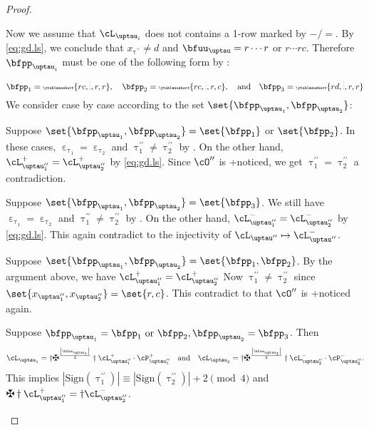 \documentclass[12pt,a4paper]{amsart}
\def\abs#1{\left|{#1}\right|}
\def\DD{\nabla}
\numberwithin{equation}{section}
\theoremstyle{remark}
\def\ssign{\mathrm{Sign}}
\let\ytb=\ytableaushort
\newcommand{\tytb}[1]{{\tiny\ytb{#1}}}
\def\cOpp{\cO^{\prime\prime}}
\def\pcL{\cL^+}
\def\ncL{\cL^-}
\def\pcP{\cP^+}
\def\ncP{\cP^-}
\def\uptaup{\uptau^{\prime}}
\def\uptaupp{\uptau^{\prime\prime}}
\begin{document}
\begin{proof}
\begin{enumPF}
\item
Now we assume that $\cL_{\uptau_{i}}$ does not contains a 1-row marked by $-/=$.
By \eqref{eq:gd.ls}, we conclude that $x_{\uptaupp}\neq d$ and
$\bfuu_{\uptau} = r\cdots r$ or $ r\cdots rc$. Therefore $\bfpp_{\uptau_{i}}$
must be one of the following form by :
  \[
    \bfpp_{1} =\tytb{rc,\vdots,r,r}, \quad \bfpp_{2}=\tytb{rc,\vdots,r,c}, \quad\text{and}
    \quad\bfpp_{3}= \tytb{rd,\vdots,r,r}\\
  \]
  We consider case by case according to the set $\set{\bfpp_{\uptau_{1}},\bfpp_{\uptau_{2}}}$:
  \begin{enumPF}
    \item Suppose
    $\set{\bfpp_{\uptau_{1}},\bfpp_{\uptau_{2}}}=\set{\bfpp_{1}}$ or $ \set{\bfpp_{2}}$.
    In these cases, $\upepsilon_{\uptau_{1}}=\upepsilon_{\uptau_{2}}$ and
    $\uptaupp_{1}\neq \uptaupp_{2}$ by .
    On the other hand, $\pcL_{\uptaupp_{1}}=\pcL_{\uptaupp_{2}}$ by \eqref{eq:gd.ls}.
    Since $\cOpp$ is +noticed, we get $\uptaupp_{1}=\uptaupp_{2}$ a contradiction.
    \item Suppose
    $\set{\bfpp_{\uptau_{1}},\bfpp_{\uptau_{2}}}=\set{\bfpp_{3}}$.
    We still have $\upepsilon_{\uptau_{1}}=\upepsilon_{\uptau_{2}}$ and
    $\uptaupp_{1}\neq \uptaupp_{2}$ by .
    On the other hand, $\ncL_{\uptaupp_{1}}=\ncL_{\uptaupp_{2}}$ by \eqref{eq:gd.ls}.
    This again contradict to the injectivity of $\cL_{\uptaupp}\mapsto \ncL_{\uptaupp}$.
    \item  Suppose
    $\set{\bfpp_{\uptau_{1}},\bfpp_{\uptau_{2}}} = \set{\bfpp_{1},\bfpp_{2}}$.
    By the argument above, we have $\pcL_{\uptaupp_{1}}=\pcL_{\uptaupp_{2}}$
    Now $\uptaupp_{1}\neq \uptaupp_{2}$ since $\set{x_{\uptaupp_{1}},x_{\uptaupp_{2}}}=\set{r,c}$.
    This contradict to that $\cOpp$ is +noticed again.
    \item\label{it:c:noticed.bij.4} Suppose $\bfpp_{\uptau_{1}} = \bfpp_{1} \text{ or } \bfpp_{2}, \bfpp_{\uptau_{2}}=\bfpp_{3}$.
    Then
   \[
    \cL_{\uptau_{1}} = \dagger\maltese^{\frac{\abs{\bfuu_{\uptau_{1}}}}{2}}\dagger\pcL_{\uptaupp_{1}}\cdot \pcP_{\uptaupp_{1}}
    \quad \text{and} \quad
    \cL_{\uptau_{2}} = \dagger\maltese^{\frac{\abs{\bfuu_{\uptau_{2}}}}{2}}\dagger\ncL_{\uptaupp_{2}}\cdot \ncP_{\uptaupp_{2}}.
    \]
    This implies
    $\abs{\ssign(\uptaupp_{1})} \equiv \abs{\ssign(\uptaupp_{2})}+2 \pmod{4}$
    and
    $\maltese \dagger \pcL_{\uptaupp_{1}}= \dagger\ncL_{\uptaupp_{2}}$.



\end{enumPF}
\end{enumPF}
\end{proof}
\end{document}
